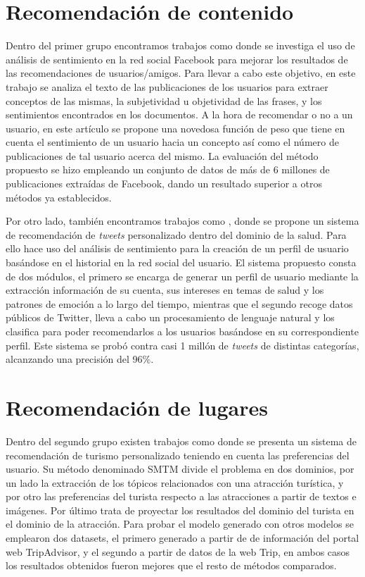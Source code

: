 \section{Recomendación de contenido}

Dentro del primer grupo encontramos trabajos como \cite{sent_analysis_facebook_user_recom} donde se investiga el uso de análisis de sentimiento en la red social Facebook para mejorar los resultados de las recomendaciones de usuarios/amigos. Para llevar a cabo este objetivo, en este trabajo se analiza el texto de las publicaciones de los usuarios para extraer conceptos de las mismas, la subjetividad u objetividad de las frases, y los sentimientos encontrados en los documentos. A la hora de recomendar o no a un usuario, en este artículo se propone una novedosa función de peso que tiene en cuenta el sentimiento de un usuario hacia un concepto así como el número de publicaciones de tal usuario acerca del mismo. La evaluación del método propuesto se hizo empleando un conjunto de datos de más de 6 millones de publicaciones extraídas de Facebook, dando un resultado superior a otros métodos ya establecidos.

Por otro lado, también encontramos trabajos como \cite{pers_tweet_recomendation}, donde se propone un sistema de recomendación de \textit{tweets} personalizado dentro del dominio de la salud. Para ello hace uso del análisis de sentimiento para la creación de un perfil de usuario basándose en el historial en la red social del usuario. El sistema propuesto consta de dos módulos, el primero se encarga de generar un perfil de usuario mediante la extracción información de su cuenta, sus intereses en temas de salud y los patrones de emoción a lo largo del tiempo, mientras que el segundo recoge datos públicos de Twitter, lleva a cabo un procesamiento de lenguaje natural y los clasifica para poder recomendarlos a los usuarios basándose en su correspondiente perfil. Este sistema se probó contra casi 1 millón de \textit{tweets} de distintas categorías, alcanzando una precisión del 96\%.

\section{Recomendación de lugares}

Dentro del segundo grupo existen trabajos como \cite{8796367} donde se presenta un sistema de recomendación de turismo personalizado teniendo en cuenta las preferencias del usuario. Su método denominado SMTM divide el problema en dos dominios, por un lado la extracción de los tópicos relacionados con una atracción turística, y por otro las preferencias del turista respecto a las atracciones a partir de textos e imágenes. Por último trata de proyectar los resultados del dominio del turista en el dominio de la atracción. Para probar el modelo generado con otros modelos se emplearon dos datasets, el primero generado a partir de de información del portal web TripAdvisor, y el segundo a partir de datos de la web Trip, en ambos casos los resultados obtenidos fueron mejores que el resto de métodos comparados.


